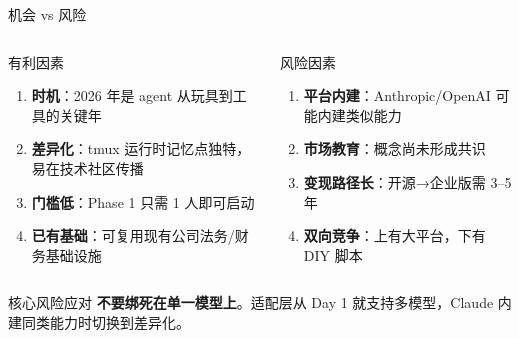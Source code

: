 \documentclass[12pt,aspectratio=169,utf8]{beamer}
\begin{document}
\begin{frame}[shrink=8]{机会 vs 风险}
  \begin{columns}[T]
    \footnotesize
    \begin{block}{有利因素 \textcolor{mygreen}{\faArrowUp}}
      \begin{enumerate}
        \item \textbf{时机}：2026 年是 agent 从玩具到工具的关键年
        \item \textbf{差异化}：tmux 运行时记忆点独特，易在技术社区传播
        \item \textbf{门槛低}：Phase 1 只需 1 人即可启动
        \item \textbf{已有基础}：可复用现有公司法务/财务基础设施
      \end{enumerate}
    \end{block}

    \footnotesize
    \begin{block}{风险因素 \textcolor{myred}{\faArrowDown}}
      \begin{enumerate}
        \item \textbf{平台内建}：Anthropic/OpenAI 可能内建类似能力
        \item \textbf{市场教育}：概念尚未形成共识
        \item \textbf{变现路径长}：开源→企业版需 3--5 年
        \item \textbf{双向竞争}：上有大平台，下有 DIY 脚本
      \end{enumerate}
    \end{block}
  \end{columns}

  \vspace{6pt}
  \begin{alertblock}{核心风险应对}
    \small\textbf{不要绑死在单一模型上}。适配层从 Day 1 就支持多模型，Claude 内建同类能力时切换到差异化。
  \end{alertblock}
\end{frame}
\end{document}
